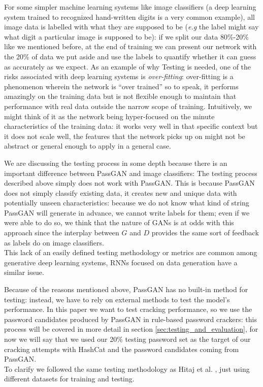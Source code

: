 For some simpler machine learning systems like image classifiers (a deep learning system trained to recognized hand-written digits is a very common example), all image data is labelled with what they are supposed to be (\emph{e.g} the label might say what digit a particular image is supposed to be): if we split our data 80\%-20\% like we mentioned before, at the end of training we can present our network with the 20\% of data we put aside and use the labels to quantify whether it can guess as accurately as we expect. As an example of why Testing is needed, one of the risks associated with deep learning systems is \emph{over-fitting}: over-fitting is a phenomenon wherein the network is \enquote{over trained} so to speak, it performs amazingly on the training data but is not flexible enough to maintain that performance with real data outside the narrow scope of training. Intuitively, we might think of it as the network being hyper-focused on the minute characteristics of the training data: it works very well in that specific context but it does not scale well, the features that the network picks up on might not be abstract or general enough to apply in a general case. 

We are discussing the testing process in some depth because there is an important difference between PassGAN and image classifiers: The testing process described above simply does not work with PassGAN.
This is because PassGAN does not simply classify existing data, it creates new and unique data with potentially unseen characteristics: because we do  not know what kind of string PassGAN will generate in advance, we cannot write labels for them; even if we were able to do so, we think that the nature of GANs is at odds with this approach since the interplay between $G$ and $D$ provides the same sort of feedback as labels do on image classifiers.\\
This lack of an easily defined testing methodology or metrics are common among generative deep learning systems, RNNs focused on data generation have a similar issue.

Because of the reasons mentioned above, PassGAN has no built-in method for testing: instead, we have to rely on external methods to test the model's performance.
In this paper we want to test cracking performance, so we use the password candidates produced by PassGAN in rule-based password crackers: this process will be covered in more detail in section \ref{sec:testing_and_evaluation}, for now we will say that we used our 20\% testing password set as the target of our cracking attempts with HashCat and the password candidates coming from PassGAN.\\
To clarify we followed the same testing methodology as Hitaj et  al. \cite{PassGAN}, just using different datasets for training and testing.

